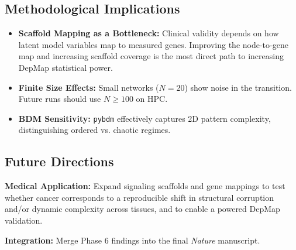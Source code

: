 \subsection{Methodological Implications}
\begin{itemize}
\item   \textbf{Scaffold Mapping as a Bottleneck:} Clinical validity depends on how latent model variables map to measured genes. Improving the node-to-gene map and increasing scaffold coverage is the most direct path to increasing DepMap statistical power.
\item   \textbf{Finite Size Effects:} Small networks ($N=20$) show noise in the transition. Future runs should use $N \ge 100$ on HPC.
\item   \textbf{BDM Sensitivity:} \texttt{pybdm} effectively captures 2D pattern complexity, distinguishing ordered vs. chaotic regimes.
\end{itemize}

\subsection{Future Directions}
\item   \textbf{Medical Application:} Expand signaling scaffolds and gene mappings to test whether cancer corresponds to a reproducible shift in structural corruption and/or dynamic complexity across tissues, and to enable a powered DepMap validation.
\item   \textbf{Integration:} Merge Phase 6 findings into the final \textit{Nature} manuscript.

